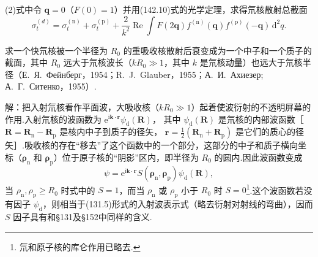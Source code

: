 \begin{xiti}
(2)式中令 $\boldsymbol{q}=0$（$F(0)=1$）并用(142.10)式的光学定理，求得氘核散射总截面
\begin{equation}
  \sigma_t^{(d)}=\sigma_t^{(\mathrm{n})}+\sigma_t^{(\mathrm{p})}
  +\frac{2}{k^2}\operatorname{Re}\int
  F(2\boldsymbol{q})f^{(\mathrm{n})}(\boldsymbol{q})f^{(\mathrm{p})}(-\boldsymbol{q})\,
  \mathrm{d}^2q.
\end{equation}

\quad 求一个快氘核被一个半径为 $R_0$ 的重吸收核散射后衰变成为一个中子和一个质子的截面，其中 $R_0$ 远大于氘核波长（$kR_0\gg1$，其中 $k$ 是氘核动量）也远大于氘核半径（Е.~Я.~Фейнберг，1954；R.~J.~Glauber，1955；А.~И.~Ахиезер; А.~Г.~Ситенко，1955）.

解：把入射氘核看作平面波，大吸收核（$kR_0\gg1$）起着使波衍射的不透明屏幕的作用.入射氘核的波函数为
$\mathrm{e}^{\mathrm{i}\boldsymbol{k}\cdot\boldsymbol{r}}\psi_{\mathrm{d}}(\boldsymbol{R})$，
其中 $\psi_{\mathrm{d}}(\boldsymbol{R})$ 是氘核的内部波函数［$\boldsymbol{R}=\boldsymbol{R}_{\mathrm{n}}-\boldsymbol{R}_{\mathrm{p}}$
是核内中子到质子的径矢，
$\boldsymbol{r}=\frac{1}{2}(\boldsymbol{R}_{\mathrm{n}}+\boldsymbol{R}_{\mathrm{p}})$
是它们的质心的径矢］.吸收核的存在“移去”了这个函数中的一个部分，这部分的中子和质子横向坐标（$\boldsymbol{\rho}_{\mathrm{n}}$ 和 $\boldsymbol{\rho}_{\mathrm{p}}$）位于原子核的“阴影”区内，即半径为 $R_0$ 的圆内.因此波函数变成
\begin{equation*}
  \psi=\mathrm{e}^{\mathrm{i}\boldsymbol{k}\cdot\boldsymbol{r}}
  S(\boldsymbol{\rho}_{\mathrm{n}},\boldsymbol{\rho}_{\mathrm{p}})\psi_{\mathrm{d}}(\boldsymbol{R}),
\end{equation*}
当 $\rho_{\mathrm{n}},\rho_{\mathrm{p}}\geqslant R_0$ 时式中的 $S=1$，而当 $\rho_{\mathrm{n}}$ 或 $\rho_{\mathrm{p}}$ 小于 $R_0$ 时 $S=0$\footnote{氘和原子核的库仑作用已略去.}.这个波函数若没有因子 $\psi_{\mathrm{d}}$，则相当于(131.5)形式的入射波表示式（略去衍射对射线的弯曲），因而 $S$ 因子具有和§131及§152中同样的含义.


\end{xiti}
